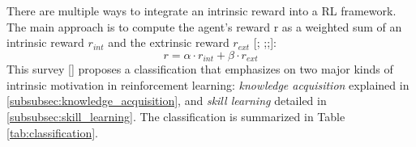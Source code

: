 \documentclass[conference]{IEEEtran}
\begin{document}
There are multiple ways to integrate an intrinsic reward into a RL framework. The main approach is to compute the agent’s reward r as a weighted sum
of an intrinsic reward $r_{int}$ and the extrinsic reward $r_{ext}$ [\cite{burda2018exploration}; \cite{gregor2016variational};\cite{vezhnevets2017feudal};\cite{huang2019learning}]:
\begin{equation*}
r = \alpha \cdot r_{int} + \beta \cdot r_{ext}
\end{equation*}
This survey [\cite{aubret2019survey}] proposes a classification that emphasizes on two major kinds of intrinsic motivation in reinforcement learning: \textit{knowledge acquisition} explained in \ref{subsubsec:knowledge_acquisition}, and \textit{skill learning} detailed in \ref{subsubsec:skill_learning}. The classification is summarized in Table \ref{tab:classification}.
\end{document}
